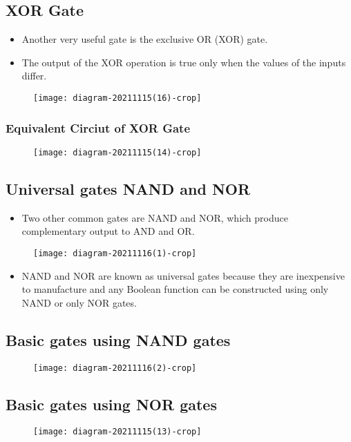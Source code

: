 \subsection{XOR Gate}
\begin{itemize}
	\item Another very useful gate is the exclusive OR (XOR) gate.
	\item The output of the XOR operation is true only when the values of the inputs differ.
\end{itemize}
\begin{figure}[H]
	\centering
	\texttt{[image: diagram-20211115(16)-crop]}
	\caption{}
	\label{}
\end{figure}
\subsubsection{Equivalent Circiut of XOR Gate}
\begin{figure}[H]
	\centering
	\texttt{[image: diagram-20211115(14)-crop]}
	\caption{}
	\label{}
\end{figure}
\subsection{Universal gates NAND and NOR}
\begin{itemize}
	\item Two other common gates are NAND and NOR, which produce complementary output to $\mathrm{AND}$ and $\mathrm{OR}$.
\end{itemize}
\begin{figure}[H]
	\centering
	\texttt{[image: diagram-20211116(1)-crop]}
	\caption{}
	\label{}
\end{figure}
\begin{itemize}
	\item NAND and NOR are known as universal gates because they are inexpensive to manufacture and any Boolean function can be constructed using only NAND or only NOR gates.
\end{itemize}
\subsection{Basic gates using NAND gates}
\begin{figure}[H]
	\centering
	\texttt{[image: diagram-20211116(2)-crop]}
	\caption{}
	\label{}
\end{figure}
\subsection{Basic gates using NOR gates}
\begin{figure}[H]
	\centering
	\texttt{[image: diagram-20211115(13)-crop]}
	\caption{}
	\label{}
\end{figure}
